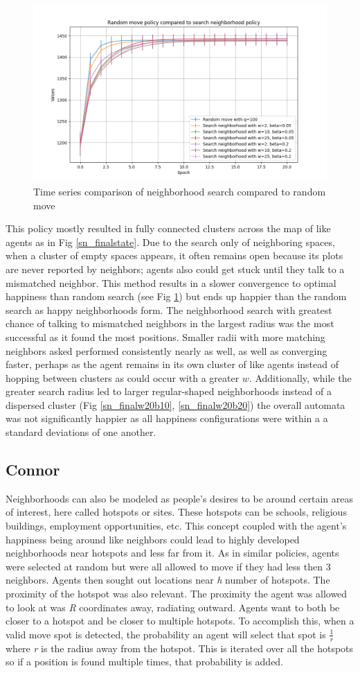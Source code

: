 \documentclass[11pt]{article}
\begin{document}
	\begin{figure}
		\centering
		\includegraphics[width=.5\textwidth]{policies02.png}
		\caption{Time series comparison of neighborhood search compared to random move}
		\label{ns_ts}
	\end{figure}
		\vspace{-.5em} %
	This policy mostly resulted in fully connected clusters across the map of like agents as in Fig \ref{sn_finalstate}. Due to the search only of neighboring spaces, when a cluster of empty spaces appears, it often remains open because its plots are never reported by neighbors; agents also could get stuck until they talk to a mismatched neighbor. This method results in a slower convergence to optimal happiness than random search (see Fig \ref{ns_ts}) but ends up happier than the random search as happy neighborhoods form. The neighborhood search with greatest chance of talking to mismatched neighbors in the largest radius was the most successful as it found the most positions. Smaller radii with more matching neighbors asked performed consistently nearly as well, as well as converging faster, perhaps as the agent remains in its own cluster of like agents instead of hopping between  clusters as could occur with a greater $w$. Additionally, while the greater search radius led to larger regular-shaped neighborhoods instead of a dispersed cluster (Fig \ref{sn_finalw20b10}, \ref{sn_finalw20b20}) the overall automata was not significantly happier as all happiness configurations were within a a standard deviations of one another.
	
	\newpage
	
	\subsection{Connor}
	Neighborhoods can also be modeled as people’s desires to be around certain areas of interest, here called hotspots or sites. These hotspots can be schools, religious buildings, employment opportunities, etc. This concept coupled with the agent’s happiness being around like neighbors could lead to highly developed neighborhoods near hotspots and less far from it. As in similar policies, agents were selected at random but were all allowed to move if they had less then 3 neighbors. Agents then sought out locations near \textit{h} number of hotspots. The proximity of the hotspot was also relevant. The proximity the agent was allowed to look at was \textit{R} coordinates away, radiating outward. Agents want to both be closer to a hotspot and be closer to multiple hotspots. To accomplish this, when a valid move spot is detected, the probability an agent will select that spot is $\frac{1}{r}$ where \textit{r} is the radius away from the hotspot. This is iterated over all the hotspots so if a position is found multiple times, that probability is added.
\end{document}
